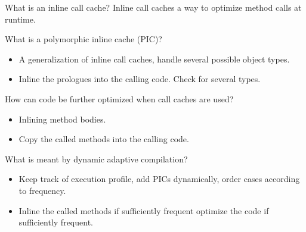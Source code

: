 \documentclass[11pt]{beamer}
\begin{document}
\begin{frame}
\begin{block}{What is an inline call cache?}
Inline call caches a way to optimize method calls at runtime.
\end{block}

\begin{block}{What is a polymorphic inline cache (PIC)?}
\begin{itemize}


\item A generalization of inline call caches, handle several possible object types.
\item Inline the prologues into the calling code. Check for several types.
\end{itemize}
\end{block}

\begin{block}{How can code be further optimized when call caches are used?}
\begin{itemize}


\item Inlining method bodies.
\item Copy the called methods into the calling code.
\end{itemize}
\end{block}
\end{frame}

\begin{frame}
\begin{block}{What is meant by dynamic adaptive compilation?}
\begin{itemize}


\item Keep track of execution profile, add PICs dynamically, order cases according to frequency.
\item Inline the called methods if sufficiently frequent optimize the code if sufficiently frequent.
\end{itemize}
\end{block}

\end{frame}
\end{document}
